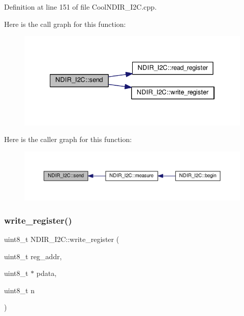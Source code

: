 Definition at line 151 of file Cool\+N\+D\+I\+R\+\_\+\+I2\+C.\+cpp.

Here is the call graph for this function\+:\nopagebreak
\begin{figure}[H]
\begin{center}
\leavevmode
\includegraphics[width=334pt]{class_n_d_i_r___i2_c_aab0c04c2b7d08e99d12af044df179f0c_cgraph}
\end{center}
\end{figure}
Here is the caller graph for this function\+:\nopagebreak
\begin{figure}[H]
\begin{center}
\leavevmode
\includegraphics[width=350pt]{class_n_d_i_r___i2_c_aab0c04c2b7d08e99d12af044df179f0c_icgraph}
\end{center}
\end{figure}
\mbox{\label{class_n_d_i_r___i2_c_a5de6a044b00e985f035edca07521e319}} 
\subsubsection{\texorpdfstring{write\+\_\+register()}{write\_register()}\hspace{0.1cm}{\footnotesize\ttfamily [1/2]}}
{\footnotesize\ttfamily uint8\+\_\+t N\+D\+I\+R\+\_\+\+I2\+C\+::write\+\_\+register (\begin{DoxyParamCaption}\item[{uint8\+\_\+t}]{reg\+\_\+addr,  }\item[{uint8\+\_\+t $\ast$}]{pdata,  }\item[{uint8\+\_\+t}]{n }\end{DoxyParamCaption})\hspace{0.3cm}{\ttfamily [private]}}



